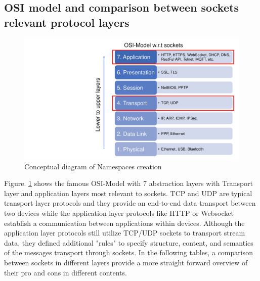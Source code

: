 \subsection{OSI model and comparison between sockets relevant protocol layers}
\begin{figure}[htbp]
\includegraphics[width=12cm]{figures/OSI.pdf}
\centering
\caption{Conceptual diagram of Namespaces creation\label{fig: OSI}}
\end{figure}

Figure. \ref{fig: OSI} shows the famous OSI-Model with 7 abstraction layers with Transport layer and application layers most relevant to sockets. TCP and UDP are typical transport layer protocols and they provide an end-to-end data transport between two devices while the application layer protocols like HTTP or Websocket establish a communication between applications within devices. Although the application layer protocols still utilize TCP/UDP sockets to transport stream data, they defined additional "rules" to specify structure, content, and semantics of the messages transport through sockets. In the following tables, a comparison between sockets in different layers provide a more straight forward overview of their pro and cons in different contents.


